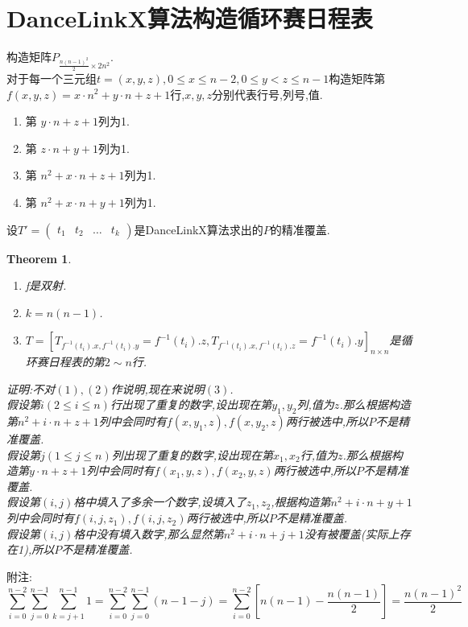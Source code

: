 \documentclass[UTF8]{ctexart}
\newcommand{\brm}[1]{\left[{{}#1}\right]}
\newtheorem{tem}[dft]{Theorem}
\begin{document}
\section{DanceLinkX算法构造循环赛日程表}
构造矩阵$P_{\frac{n(n-1)^2}{2}\times 2n^2}$.\\
\indent 对于每一个三元组$t=(x,y,z),0\leqslant x\leqslant n -2, 0\leqslant y < z \leqslant n - 1$构造矩阵第$f(x,y,z)=x\cdot n^2 + y \cdot n + z + 1$行,$x,y,z$分别代表行号,列号,值.
\begin{enumerate}
    \item 第 $y\cdot n + z + 1$列为1.
    \item 第 $z\cdot n + y + 1$列为1.
    \item 第 $n^2 +x\cdot n + z + 1$列为1.
    \item 第 $n^2 +x\cdot n + y + 1$列为1.
\end{enumerate}
设$T'=\begin{pmatrix}
    t_1 & t_2 & \dots & t_{k}
\end{pmatrix}$是DanceLinkX算法求出的$P$的精准覆盖.
\begin{tem}
\begin{enumerate}[$(1)$]
    \item f是双射.
    \item $k=n(n-1)$.
    \item $T=\brm{T_{f^{-1}(t_i).x,f^{-1}(t_i).y} = f^{-1}(t_i).z, T_{f^{-1}(t_i).x,f^{-1}(t_i).z} = f^{-1}(t_i).y}_{n\times n}$是循环赛日程表的第$2\sim n$行.
\end{enumerate}
\noindent 证明:不对$(1),(2)$作说明,现在来说明$(3)$.\\
假设第$i(2\leqslant i \leqslant n)$行出现了重复的数字,设出现在第$y_1,y_2$列,值为$z$.那么根据构造第$n^2 + i\cdot n + z + 1$列中会同时有$f(x,y_1,z),f(x,y_2,z)$两行被选中,所以$P$不是精准覆盖.\\
假设第$j(1\leqslant j\leqslant n)$列出现了重复的数字,设出现在第$x_1,x_2$行,值为$z$.那么根据构造第$y\cdot n + z + 1$列中会同时有$f(x_1,y,z),f(x_2,y,z)$两行被选中,所以$P$不是精准覆盖.\\
假设第$(i,j)$格中填入了多余一个数字,设填入了$z_1,z_2$,根据构造第$n^2 + i\cdot n + y + 1$列中会同时有$f(i,j,z_1),f(i,j,z_2)$两行被选中,所以$P$不是精准覆盖.\\
假设第$(i,j)$格中没有填入数字,那么显然第$n^2 + i \cdot n + j + 1$没有被覆盖(实际上存在1),所以$P$不是精准覆盖.\\
\end{tem}
附注:
$$
    \sum_{i=0}^{n-2}\sum_{j=0}^{n - 1}\sum_{k=j+1}^{n-1} 1 = \sum_{i=0}^{n-2}\sum_{j=0}^{ n -1} (n-1 - j) = \sum_{i = 0}^{n-2}\brm{n(n-1) - \frac{n(n-1)}{2}} = \frac{n(n-1)^2}{2}
$$
\end{document}
